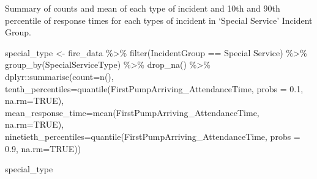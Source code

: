 \documentclass[
]{article}
\newenvironment{Shaded}{\begin{snugshade}}{\end{snugshade}}
\newcommand{\AttributeTok}[1]{\textcolor[rgb]{0.77,0.63,0.00}{#1}}
\newcommand{\ConstantTok}[1]{\textcolor[rgb]{0.00,0.00,0.00}{#1}}
\newcommand{\FloatTok}[1]{\textcolor[rgb]{0.00,0.00,0.81}{#1}}
\newcommand{\FunctionTok}[1]{\textcolor[rgb]{0.00,0.00,0.00}{#1}}
\newcommand{\NormalTok}[1]{#1}
\newcommand{\OtherTok}[1]{\textcolor[rgb]{0.56,0.35,0.01}{#1}}
\newcommand{\SpecialCharTok}[1]{\textcolor[rgb]{0.00,0.00,0.00}{#1}}
\newcommand{\StringTok}[1]{\textcolor[rgb]{0.31,0.60,0.02}{#1}}
\begin{document}
Summary of counts and mean of each type of incident and 10th and 90th
percentile of response times for each types of incident in `Special
Service' Incident Group.

\begin{Shaded}
\begin{Highlighting}[]
\NormalTok{special\_type }\OtherTok{\textless{}{-}}\NormalTok{ fire\_data }\SpecialCharTok{\%\textgreater{}\%} \FunctionTok{filter}\NormalTok{(IncidentGroup }\SpecialCharTok{==} \StringTok{\textquotesingle{}Special Service\textquotesingle{}}\NormalTok{) }\SpecialCharTok{\%\textgreater{}\%} \FunctionTok{group\_by}\NormalTok{(SpecialServiceType) }\SpecialCharTok{\%\textgreater{}\%} \FunctionTok{drop\_na}\NormalTok{() }\SpecialCharTok{\%\textgreater{}\%}\NormalTok{ dplyr}\SpecialCharTok{::}\FunctionTok{summarise}\NormalTok{(}\AttributeTok{count=}\FunctionTok{n}\NormalTok{(), }\AttributeTok{tenth\_percentiles=}\FunctionTok{quantile}\NormalTok{(FirstPumpArriving\_AttendanceTime, }\AttributeTok{probs =} \FloatTok{0.1}\NormalTok{, }\AttributeTok{na.rm=}\ConstantTok{TRUE}\NormalTok{), }\AttributeTok{mean\_response\_time=}\FunctionTok{mean}\NormalTok{(FirstPumpArriving\_AttendanceTime, }\AttributeTok{na.rm=}\ConstantTok{TRUE}\NormalTok{), }\AttributeTok{ninetieth\_percentiles=}\FunctionTok{quantile}\NormalTok{(FirstPumpArriving\_AttendanceTime, }\AttributeTok{probs =} \FloatTok{0.9}\NormalTok{, }\AttributeTok{na.rm=}\ConstantTok{TRUE}\NormalTok{))}

\NormalTok{special\_type}
\end{Highlighting}
\end{Shaded}
\end{document}
